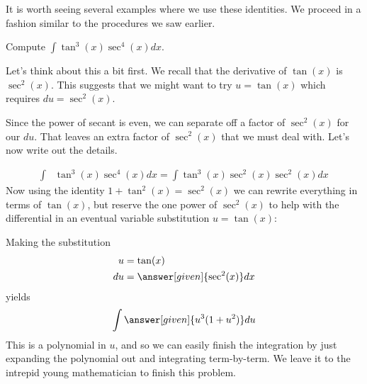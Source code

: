\documentclass{ximera}
\begin{document}
It is worth seeing several examples where we use these identities. We proceed in a fashion similar to the procedures we saw earlier. 

\begin{example}
  Compute $\int \tan^3(x) \sec^4(x) dx$.
  
  \begin{explanation}
    Let's think about this a bit first.  We recall that the derivative of $\tan(x)$ is $\sec^{2}(x)$. This suggests that we might want to try $u=\tan(x)$ which requires  $du=\sec^{2}(x)$.
     
    Since the power of secant is even, we can separate off a factor of $\sec^{2}(x)$ for our $du$. That leaves an extra factor
    of $\sec^{2}(x)$ that we must deal with. Let's now write out the details.

    \begin{align*}
    \int &\tan^3(x) \sec^4(x) dx = \int\tan^3(x) \sec^2(x) \sec^2(x) dx
    \end{align*}
    Now using the identity $1+\tan^{2}(x)=\sec^{2}(x)$ we can rewrite everything in
    terms of $\tan(x)$, but reserve the one power of $\sec^2(x)$ to help
    with the differential in an eventual variable substitution $u=\tan(x)$:
    \begin{center}%
    \end{center}
    Making the substitution
    \begin{align*}
       u &= \tan(x)\\
      du &=\answer[given]{\sec^2(x)} dx
    \end{align*}
    yields
    \[
    \int \answer[given]{u^3(1+u^2)} du
    \]
    This is a polynomial in $u$, and so we can easily finish the
    integration by just expanding the polynomial out and integrating
    term-by-term. We leave it to the intrepid young mathematician to
    finish this problem.
  \end{explanation}
\end{example}
\end{document}
